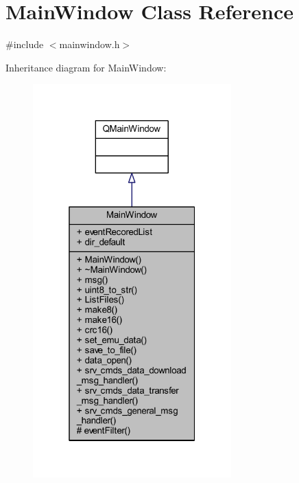 \hypertarget{a00006}{\section{Main\+Window Class Reference}
\label{a00006}
}


{\ttfamily \#include $<$mainwindow.\+h$>$}



Inheritance diagram for Main\+Window\+:
\nopagebreak
\begin{figure}[H]
\begin{center}
\leavevmode
\includegraphics[width=217pt]{da/ddc/a00288}
\end{center}
\end{figure}


